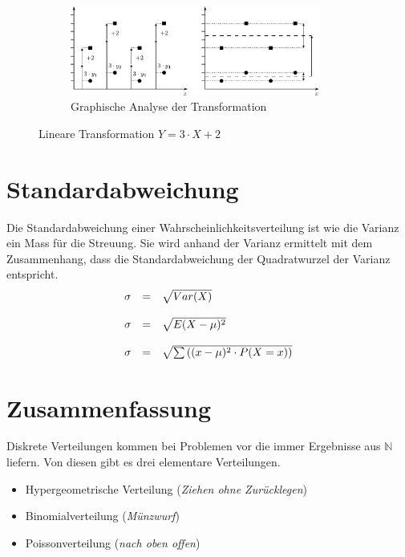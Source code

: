 \begin{figure}[h!]
\rule[1mm]{0mm}{5mm}

\begin{subfigure}[b]{1\textwidth}
\centering
\includegraphics[width=0.9\textwidth]{lintrans.pdf}
\caption{Graphische Analyse der Transformation}
\end{subfigure}

\caption{Lineare Transformation $Y = 3 \cdot X + 2$}
\label{fig:lintrans}
\end{figure}

\section{Standardabweichung}
Die Standardabweichung einer Wahrscheinlichkeitsverteilung 
ist wie die Varianz ein Mass für die Streuung. Sie 
wird anhand der Varianz ermittelt mit dem Zusammenhang, dass die 
Standardabweichung der Quadratwurzel der Varianz entspricht.
\[ \begin{array}{l c l} 
	\sigma 
		& = 
		& \sqrt{Var(X)} \\
	& & \\
	\sigma
		& =
		& \sqrt{E(X-\mu)^2} \\
	& & \\
	\sigma
		& =
		& \sqrt{\sum \left( (x-\mu)^2 \cdot P(X=x) \right)}
\end{array} \]

\section{Zusammenfassung}
Diskrete Verteilungen kommen bei Problemen vor die immer Ergebnisse
aus $\mathbb{N}$ liefern. Von diesen gibt es drei elementare Verteilungen.

\begin{itemize}
	\item Hypergeometrische Verteilung 
		\hfill{} (\emph{Ziehen ohne Zurücklegen})
	\item Binomialverteilung 
		\hfill{} (\emph{Münzwurf})
	\item Poissonverteilung 
		\hfill{} (\emph{nach oben offen})
\end{itemize}

